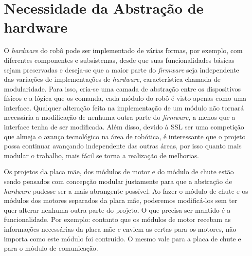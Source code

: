 \chapter{Necessidade da Abstração de hardware}\label{cap:necessidade_abstr_hw}

O \textit{hardware} do robô pode ser implementado de várias formas, por exemplo, com diferentes componentes e subsistemas, desde que suas funcionalidades básicas sejam preservadas e deseja-se que a maior parte do \textit{firmware} seja independente das variações de implementações de \textit{hardware}, característica chamada de modularidade. Para isso, cria-se uma camada de abstração entre os dispositivos físicos e a lógica que os comanda, cada módulo do robô é visto apenas como uma interface. Qualquer alteração feita na implementação de um módulo não tornará necessária a modificação de nenhuma outra parte do \textit{firmware}, a menos que a interface tenha de ser modificada. Além disso, devido à SSL ser uma competição que almeja o avanço tecnológico na área de robótica, é interessante que o projeto possa continuar avançando independente das outras áreas, por isso quanto mais modular o trabalho, mais fácil se torna a realização de melhorias.

Os projetos da placa mãe, dos módulos de motor e do módulo de chute estão sendo pensados com concepção modular justamente para que a abstração de \textit{hardware} pudesse ser a mais abrangente possível. Ao fazer o módulo de chute e os módulos dos motores separados da placa mãe, poderemos modificá-los sem ter quer alterar nenhuma outra parte do projeto. O que precisa ser mantido é a funcionalidade. Por exemplo: contanto que os módulos de motor recebam as informações necessárias da placa mãe e enviem as certas para os motores, não importa como este módulo foi contruído. O mesmo vale para a placa de chute e para o módulo de comunicação.

